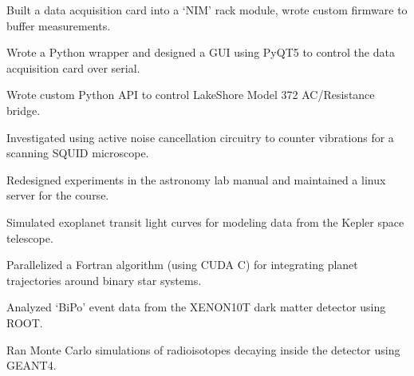 \documentclass[]{resume-template}
\begin{document}
\begin{tightemize}
\item Built a data acquisition card into a `NIM' rack module,  wrote custom firmware to buffer measurements.
\item Wrote a Python wrapper and designed a GUI using PyQT5 to control the data acquisition card over serial. 
\item Wrote custom Python API to control LakeShore Model 372 AC/Resistance bridge.
\item Investigated using active noise cancellation circuitry to counter vibrations for a scanning SQUID microscope.
\item Redesigned experiments in the astronomy lab manual and maintained a linux server for the course.
\end{tightemize}
\sectionsep
\vspace{-1ex} %
\begin{tightemize}
\item Simulated exoplanet transit light curves for modeling data from the Kepler space telescope.
\item Parallelized a Fortran algorithm (using CUDA C) for integrating planet trajectories around binary star systems.
\end{tightemize}
\sectionsep

\begin{tightemize}
\item Analyzed `BiPo' event data from the XENON10T dark matter detector using ROOT.
\item Ran Monte Carlo simulations of radioisotopes decaying inside the detector using GEANT4.
\end{tightemize}
\sectionsep
\end{document}
